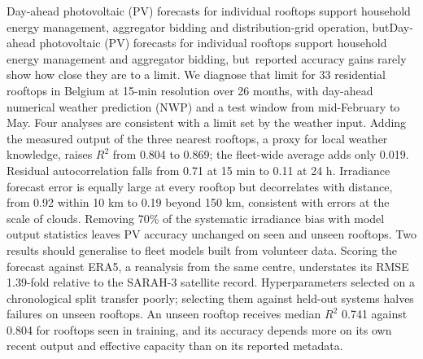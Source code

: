 \ifepsr Day-ahead photovoltaic (PV) forecasts for individual rooftops support household energy management, aggregator bidding and distribution-grid operation, but\else Day-ahead photovoltaic (PV) forecasts for individual rooftops support household energy management and aggregator bidding, but\fi\ reported accuracy gains rarely show how close they are to a limit. We diagnose that limit for 33 residential rooftops in Belgium at 15-min resolution over 26 months, with day-ahead numerical weather prediction (NWP) and a test window from mid-February to May. Four analyses are consistent with a limit set by the weather input. Adding the measured output of the three nearest rooftops, a proxy for local weather knowledge, raises $R^2$ from 0.804 to 0.869; the fleet-wide average adds only 0.019. Residual autocorrelation falls from 0.71 at 15 min to 0.11 at 24 h. Irradiance forecast error is equally large at every rooftop but decorrelates with distance, from 0.92 within 10 km to 0.19 beyond 150 km, consistent with errors at the scale of clouds. Removing 70\% of the systematic irradiance bias with model output statistics leaves PV accuracy unchanged on seen and unseen rooftops. Two results should generalise to fleet models built from volunteer data. Scoring the forecast against ERA5, a reanalysis from the same centre, understates its RMSE 1.39-fold relative to the SARAH-3 satellite record. Hyperparameters selected on a chronological split transfer poorly; selecting them against held-out systems halves failures on unseen rooftops. An unseen rooftop receives median $R^2$ 0.741 against 0.804 for rooftops seen in training, and its accuracy depends more on its own recent output and effective capacity than on its reported metadata.
